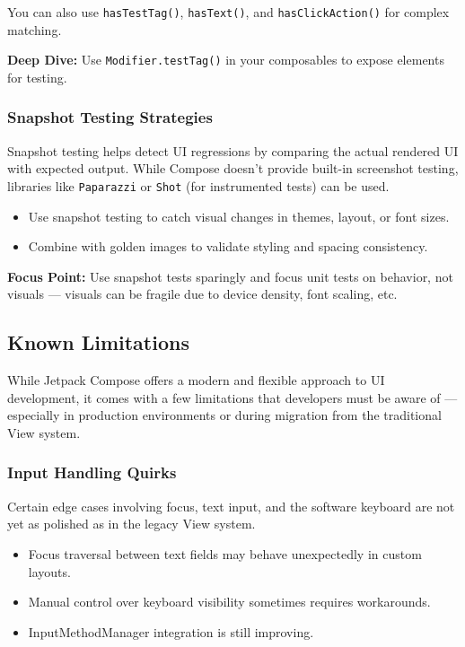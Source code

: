 \documentclass[a4paper,12pt]{article}
\begin{document}
You can also use \texttt{hasTestTag()}, \texttt{hasText()}, and \texttt{hasClickAction()} for complex matching.

\textbf{Deep Dive:} Use \texttt{Modifier.testTag()} in your composables to expose elements for testing.

\subsubsection{Snapshot Testing Strategies}

Snapshot testing helps detect UI regressions by comparing the actual rendered UI with expected output. While Compose doesn’t provide built-in screenshot testing, libraries like \texttt{Paparazzi} or \texttt{Shot} (for instrumented tests) can be used.

\begin{itemize}
  \item Use snapshot testing to catch visual changes in themes, layout, or font sizes.
  \item Combine with golden images to validate styling and spacing consistency.
\end{itemize}

\textbf{Focus Point:} Use snapshot tests sparingly and focus unit tests on behavior, not visuals — visuals can be fragile due to device density, font scaling, etc.

\subsection{Known Limitations}

While Jetpack Compose offers a modern and flexible approach to UI development, it comes with a few limitations that developers must be aware of — especially in production environments or during migration from the traditional View system.

\subsubsection{Input Handling Quirks}

Certain edge cases involving focus, text input, and the software keyboard are not yet as polished as in the legacy View system.

\begin{itemize}
  \item Focus traversal between text fields may behave unexpectedly in custom layouts.
  \item Manual control over keyboard visibility sometimes requires workarounds.
  \item InputMethodManager integration is still improving.
\end{itemize}
\end{document}
